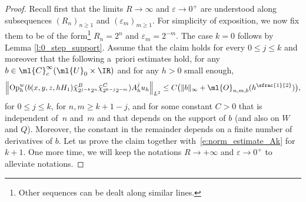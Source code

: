 \documentclass[10pt]{amsart}
\theoremstyle{plain}
\theoremstyle{definition}
\theoremstyle{remark}
\newcommand{\Op}{\operatorname{Op}}
\begin{document}
\begin{proof}
Recall first that the limits $R\to\infty$ and $\varepsilon\to 0^+$ are understood along subsequences $(R_n)_{n\geq 1}$ and $(\varepsilon_m)_{m\geq 1}$. For simplicity of exposition, we now fix them to be of the form\footnote{Other sequences can be dealt along similar lines.} $R_n=2^n$ and $\varepsilon_m=2^{-m}$. The case $k = 0$ follows by Lemma \ref{l:0_step_support}. Assume that the claim holds for every $0\leq j\leq k$ and moreover that the following a~priori estimates hold, for any $b\in\ml{C}^{\infty}_c(\ml{U}_0\times\IR)$ and for any $h>0$ small enough,
\begin{equation}
\label{e:norm_estimate_Ak}
\left\| \Op_h^w(b(x,y,z,hH_1)\tilde{\chi}_{2^{j-k}2^n}^B\tilde{\chi}_{2^{ k-j}2^{-m}}^C)A^j_h u_h \right\|_{L^2} \leq C\bigl(\|b\|_\infty+\ml{O}_{n,m,b}(h^{\sfrac{1}{2}})\bigr),
\end{equation}
for $0 \leq j \leq k$, for $n,m \geq k+1 - j$, and for some constant $C>0$ that is independent of~$n$ and~$m$ and that depends on the support of $b$ (and also on $W$ and $Q$). Moreover, the constant in the remainder depends on a finite number of derivatives of $b$. Let us prove the claim together with~\eqref{e:norm_estimate_Ak} for $k+1$. One more time, we will keep the notations $R\to+\infty$ and $\varepsilon\to 0^+$ to alleviate notations.


\end{proof}
\end{document}
